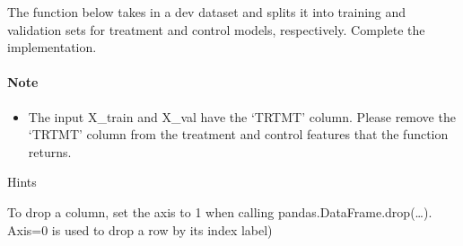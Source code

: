 \documentclass[11pt]{article}
\providecommand{\tightlist}{%
      \setlength{\itemsep}{0pt}\setlength{\parskip}{0pt}}
\begin{document}
The function below takes in a dev dataset and splits it into training
and validation sets for treatment and control models, respectively.
Complete the implementation.

\hypertarget{note}{%
\paragraph{Note}\label{note}}

\begin{itemize}
\tightlist
\item
  The input X\_train and X\_val have the `TRTMT' column. Please remove
  the `TRTMT' column from the treatment and control features that the
  function returns.
\end{itemize}

     Hints

To drop a column, set the axis to 1 when calling
pandas.DataFrame.drop(\ldots{}). Axis=0 is used to drop a row by its
index label)
\end{document}
